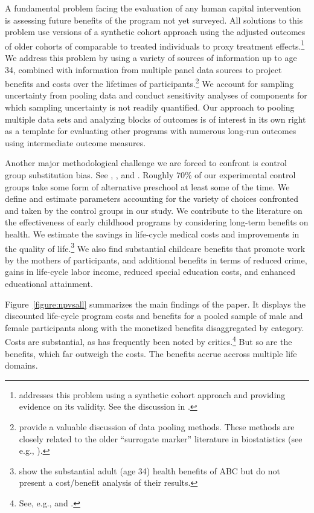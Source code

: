 A fundamental problem facing the evaluation of any human capital intervention is assessing future benefits of the program not yet surveyed. All solutions to this problem use versions of a synthetic cohort approach using the adjusted outcomes of older cohorts of comparable to treated individuals to proxy treatment effects.\footnote{\cite{Mincer_1974_schooling} addresses this problem using a synthetic cohort approach and providing evidence on its validity. See the discussion in \cite{Heckman_Lochner_ea_2006_HEE}.} We address this problem by using a variety of sources of information up to age 34, combined with information from multiple panel data sources to project benefits and costs over the lifetimes of participants.\footnote{\citet{Ridder_Moffitt_2007_hbk_metricsdata} provide a valuable discussion of data pooling methods. These methods are closely related to the older ``surrogate marker'' literature in biostatistics (see e.g., \citealp{Prentice_1989_Surrogate_SiM}).} We account for sampling uncertainty from pooling data and conduct sensitivity analyses of components for which sampling uncertainty is not readily quantified. Our approach to pooling multiple data sets and analyzing blocks of outcomes is of interest in its own right as a template for evaluating other programs with numerous long-run outcomes using intermediate outcome measures.

Another major methodological challenge we are forced to confront is control group substitution bias. See \cite{Heckman_1992_randomization}, \cite{Heckman_Hohmann_etal_2000_QJE}, and \cite{Kline_Walters_2016_QJE}. Roughly 70\% of our experimental control groups take some form of alternative preschool at least some of the time. We define and estimate parameters accounting for the variety of choices confronted and taken by the control groups in our study. We contribute to the literature on the effectiveness of early childhood programs by considering long-term benefits on health. We estimate the savings in life-cycle medical costs and improvements in the quality of life.\footnote{\cite{Campbell_Conti_etal_2014_EarlyChildhoodInvestments} show the substantial adult (age 34) health benefits of ABC but do not present a cost/benefit analysis of their results.} We also find substantial childcare benefits that promote work by the mothers of participants, and additional benefits in terms of reduced crime, gains in life-cycle labor income, reduced special education costs, and enhanced educational attainment.

Figure~\ref{figure:npvsall} summarizes the main findings of the paper. It displays the discounted life-cycle program costs and benefits for a pooled sample of male and female participants along with the monetized benefits disaggregated by category. Costs are substantial, as has frequently been noted by critics.\footnote{See, e.g., \citet{Whitehurst_2014_Senate_Testimony} and \citet{Fox_News_2014_Head_Start_Effects}.} But so are the benefits, which far outweigh the costs. The benefits accrue accross multiple life domains.

